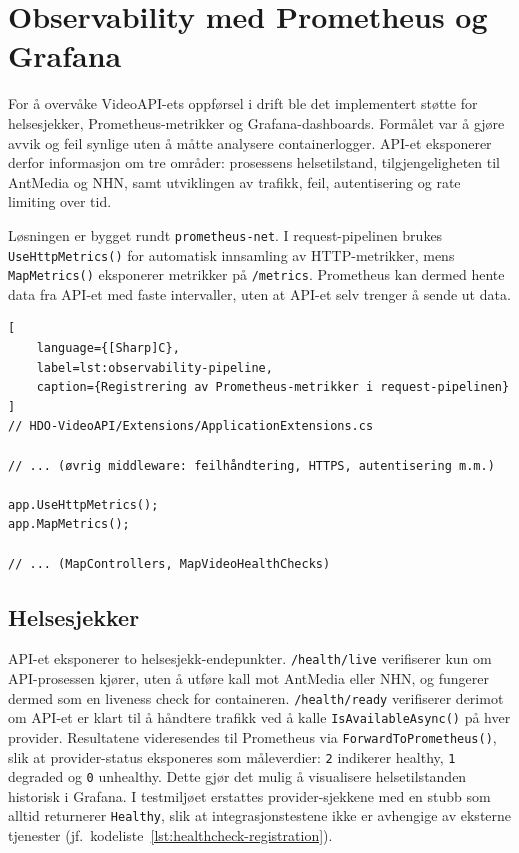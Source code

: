 \section{Observability med Prometheus og Grafana}
\label{sec:imp-observability}

For å overvåke VideoAPI-ets oppførsel i drift ble det implementert støtte for helsesjekker, Prometheus-metrikker og Grafana-dashboards. Formålet var å gjøre avvik og feil synlige uten å måtte analysere containerlogger. API-et eksponerer derfor informasjon om tre områder: prosessens helsetilstand, tilgjengeligheten til AntMedia og NHN, samt utviklingen av trafikk, feil, autentisering og rate limiting over tid.

Løsningen er bygget rundt \texttt{prometheus-net}. I request-pipelinen brukes \texttt{UseHttpMetrics()} for automatisk innsamling av HTTP-metrikker, mens \texttt{MapMetrics()} eksponerer metrikker på \texttt{/metrics}. Prometheus kan dermed hente data fra API-et med faste intervaller, uten at API-et selv trenger å sende ut data.

\begin{lstlisting}[
    language={[Sharp]C},
    label=lst:observability-pipeline,
    caption={Registrering av Prometheus-metrikker i request-pipelinen}
]
// HDO-VideoAPI/Extensions/ApplicationExtensions.cs

// ... (øvrig middleware: feilhåndtering, HTTPS, autentisering m.m.)

app.UseHttpMetrics();
app.MapMetrics();

// ... (MapControllers, MapVideoHealthChecks)
\end{lstlisting}

\subsection{Helsesjekker}


API-et eksponerer to helsesjekk-endepunkter. \texttt{/health/live} verifiserer kun om API-prosessen kjører, uten å utføre kall mot AntMedia eller NHN, og fungerer dermed som en liveness check for containeren. \texttt{/health/ready} verifiserer derimot om API-et er klart til å håndtere trafikk ved å kalle \texttt{IsAvailableAsync()} på hver provider. Resultatene videresendes til Prometheus via \texttt{ForwardToPrometheus()}, slik at provider-status eksponeres som måleverdier: \texttt{2} indikerer healthy, \texttt{1} degraded og \texttt{0} unhealthy. Dette gjør det mulig å visualisere helsetilstanden historisk i Grafana. I testmiljøet erstattes provider-sjekkene med en stubb som alltid returnerer \texttt{Healthy}, slik at integrasjonstestene ikke er avhengige av eksterne tjenester (jf.\ kodeliste~\ref{lst:healthcheck-registration}).


